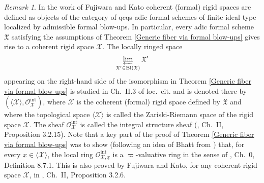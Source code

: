 \documentclass[12pt,twoside,a4paper]{article}
\theoremstyle{definition}
\theoremstyle{remark}
\newtheorem{rmk}[thm]{Remark}
\newcommand\Bl{{\rm Bl}}
\begin{document}
\begin{rmk}\label{Relation to Fujiwara-Kato}In the work \cite{FK} of Fujiwara and Kato coherent (formal) rigid spaces are defined as objects of the category of qcqs adic formal schemes of finite ideal type localized by admissible formal blow-ups. In particular, every adic formal scheme $\mathfrak{X}$ satisfying the assumptions of Theorem \ref{Generic fiber via formal blow-ups} gives rise to a coherent rigid space $\mathscr{X}$. The locally ringed space\begin{equation*}\varprojlim_{\mathfrak{X}'\in\Bl(\mathfrak{X})}\mathfrak{X}'\end{equation*}appearing on the right-hand side of the isomorphism in Theorem \ref{Generic fiber via formal blow-ups} is studied in Ch.~II.3 of loc.~cit. and is denoted there by $(\langle\mathscr{X}\rangle, \mathcal{O}_{\mathscr{X}}^{\textrm{int}})$, where $\mathscr{X}$ is the coherent (formal) rigid space defined by $\mathfrak{X}$ and where the topological space $\langle\mathscr{X}\rangle$ is called the Zariski-Riemann space of the rigid space $\mathscr{X}$. The sheaf $\mathcal{O}_{\mathscr{X}}^{\textrm{int}}$ is called the integral structure sheaf (\cite{FK}, Ch.~II, Proposition 3.2.15). Note that a key part of the proof of Theorem \ref{Generic fiber via formal blow-ups} was to show (following an idea of Bhatt from \cite{BhattNotes}) that, for every $\underline{x}\in\langle\mathscr{X}\rangle$, the local ring $\mathcal{O}_{\mathscr{X},\underline{x}}^{\textrm{int}}$ is a $\varpi$-valuative ring in the sense of \cite{FK}, Ch.~0, Definition 8.7.1. This is also proved by Fujiwara and Kato, for any coherent rigid space $\mathscr{X}$, in \cite{FK}, Ch.~II, Proposition 3.2.6. 


\end{rmk}
\end{document}
